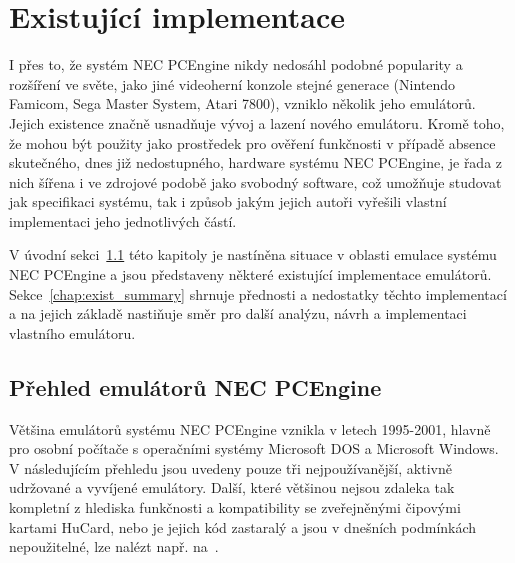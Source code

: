 
\chapter{Existující implementace}\label{chap:exist}

I přes to, že systém NEC PCEngine nikdy nedosáhl podobné popularity a rozšíření
ve světe, jako jiné videoherní konzole stejné generace (Nintendo Famicom, Sega
Master System, Atari 7800), vzniklo několik jeho emulátorů. Jejich existence
značně usnadňuje vývoj a lazení nového emulátoru. Kromě toho, že mohou být
použity jako prostředek pro ověření funkčnosti v případě absence skutečného,
dnes již nedostupného, hardware systému NEC PCEngine, je řada z nich šířena i
ve zdrojové podobě jako svobodný software, což umožňuje studovat jak
specifikaci systému, tak i způsob jakým jejich autoři vyřešili vlastní
implementaci jeho jednotlivých částí.

V úvodní sekci~\ref{chap:exist_listing} této kapitoly je nastíněna situace v
oblasti emulace systému NEC PCEngine a jsou představeny některé existující
implementace emulátorů. Sekce~\ref{chap:exist_summary} shrnuje přednosti a
nedostatky těchto implementací a na jejich základě nastiňuje směr pro další
analýzu, návrh a implementaci vlastního emulátoru.


\section{Přehled emulátorů NEC PCEngine}\label{chap:exist_listing}

Většina emulátorů systému NEC PCEngine vznikla v letech 1995-2001, hlavně pro
osobní počítače s operačními systémy Microsoft DOS a Microsoft Windows. V
následujícím přehledu jsou uvedeny pouze tři nejpoužívanější, aktivně udržované
a vyvíjené emulátory. Další, které většinou nejsou zdaleka tak kompletní z
hlediska funkčnosti a kompatibility se zveřejněnými čipovými kartami HuCard,
nebo je jejich kód zastaralý a jsou v dnešních podmínkách nepoužitelné, lze
nalézt např. na~\cite{wwwEmulatorZone}.


